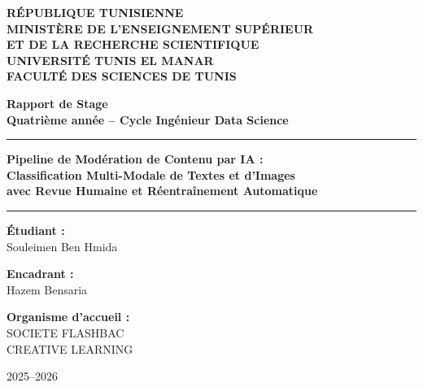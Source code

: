\begin{titlepage}
  \begin{center}
    \vspace*{0.5cm}

    {\normalsize\bfseries RÉPUBLIQUE TUNISIENNE\\
    MINISTÈRE DE L'ENSEIGNEMENT SUPÉRIEUR\\
    ET DE LA RECHERCHE SCIENTIFIQUE\\[0.5em]
    UNIVERSITÉ TUNIS EL MANAR\\
    FACULTÉ DES SCIENCES DE TUNIS}

    \vspace{1.2cm}

    {\large\bfseries Rapport de Stage\\[0.3em]
    Quatrième année -- Cycle Ingénieur Data Science}

    \vspace{1cm}

    {\rule{\textwidth}{1.5pt}}

    \vspace{1.2cm}

    {\LARGE\bfseries Pipeline de Modération de Contenu par IA :\\[0.3em]
    Classification Multi-Modale de Textes et d'Images\\[0.3em]
    avec Revue Humaine et Réentraînement Automatique}

    \vspace{1.2cm}

    {\rule{\textwidth}{1.5pt}}

    \vspace{1.8cm}

    \begin{minipage}[t]{0.32\textwidth}
      \begin{flushleft}\large
        \textbf{Étudiant :}\\[0.2em]
        Souleimen Ben Hmida
      \end{flushleft}
    \end{minipage}
    \hfill
    \begin{minipage}[t]{0.32\textwidth}
      \begin{center}\large
        \textbf{Encadrant :}\\[0.2em]
        Hazem Bensaria
      \end{center}
    \end{minipage}
    \hfill
    \begin{minipage}[t]{0.32\textwidth}
      \begin{flushright}\large
        \textbf{Organisme d'accueil :}\\[0.2em]
        SOCIETE FLASHBAC\\
        CREATIVE LEARNING
      \end{flushright}
    \end{minipage}

    \vfill

    {\large 2025--2026}

  \end{center}
\end{titlepage}
